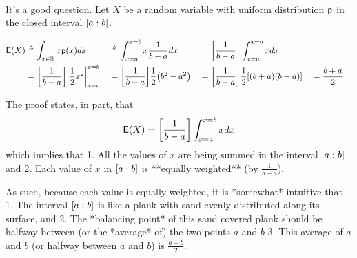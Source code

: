 $\newcommand{\ds}{\displaystyle}$
$\newcommand{\mean}{\mu}$
$\newcommand{\popvar}{\sigma^2}$
$\newcommand{\cmom}{\mu}$
$\newcommand{\meanest}{\hat{\mean}}$
$\newcommand{\seqn}[1]{\left\{#1\right\}}$
$\newcommand{\rvx}{x}$
$\newcommand{\xN}{N}$
$\newcommand{\eqd}{\triangleq}$
$\newcommand{\brp}[1]{{\left(#1\right)}}$
$\newcommand{\brs}[1]{{\left[#1\right]}}$
$\newcommand{\brl}[1]{{\left.#1\right|}}$
$\newcommand{\moment}{M}$
$\newcommand{\momest}{\hat{\moment}}$
$\newcommand{\meanest}{\hat{\mean}}$
$\newcommand{\cmomest}{\hat{\cmom}}$
$\newcommand{\varest}{\hat{\var}}$
$\newcommand{\mcom}[2]{{\displaystyle\underbrace{\displaystyle#1}_{\text{#2}}}}$
$\newcommand{\indentx}{\ensuremath{\mbox{}\qquad}}$
$\newcommand{\bcoef}[2]{{#1\choose#2}}$
$\newcommand{\pE}{\mathsf{E}}$
$\newcommand{\pdf}{{\mathsf{p}}}$
$\newcommand{\intcc}[2]{{\left[#1:#2\right]}}$
$\newcommand{\brlr}[1]{\left.#1\right|}$
$\newcommand{\dx}{dx}$
$\newcommand{\R}{\mathbb{R}}$

It's a good question.
Let $X$ be a random variable with uniform distribution $\pdf$ in the closed interval $\intcc{a}{b}$.

\begin{align*}
  \pE\brp{X}
    &\eqd \int_{x\in\R} x \pdf(x) \dx
   &&\eqd \int_{x=a}^{x=b} x \frac{1}{b-a} \dx
   &&=    \brs{\frac{1}{b-a}} \int_{x=a}^{x=b} x \dx
  \\&=    \brs{\frac{1}{b-a}} \brlr{\frac{1}{2}x^2}_{x=a}^{x=b}
   &&=    \brs{\frac{1}{b-a}} \frac{1}{2} \brp{ b^2 - a^2 }
   &&=    \brs{\frac{1}{b-a}} \frac{1}{2} \brs{ (b+a)(b-a) }
   &&=    \frac{b + a}{2}
\end{align*}

The proof states, in part, that $$\pE\brp{X}=\brs{\frac{1}{b-a}} \int_{x=a}^{x=b} x \dx$$
which implies that 
  1. All the values of $x$ are being summed in the interval $\intcc{a}{b}$ and
  2. Each value of $x$ in $\intcc{a}{b}$ is **equally weighted** (by $\frac{1}{b-a}$).

As such, because each value is equally weighted, it is *somewhat* intuitive that 
  1. The interval $\intcc{a}{b}$ is like a plank with sand evenly distributed along its surface, and
  2. The *balancing point* of this sand covered plank should be halfway between (or the *average* of) the two points $a$ and $b$
  3. This average of $a$ and $b$ (or halfway between $a$ and $b$) is $\frac{a+b}{2}$.
